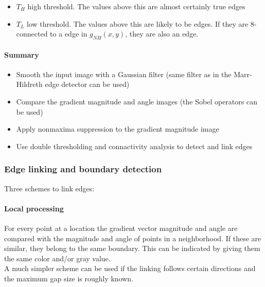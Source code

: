 \begin{itemize}
\item $T_H$ high threshold. The values above this are almost certainly true edges
\item $T_L$ low threshold. The values above this are likely to be edges. If they are 8-connected to a edge in $g_{NH}(x,y)$, they are also an edge.
\end{itemize}

\paragraph{Summary}
\begin{itemize}
\item Smooth the input image with a Gaussian filter (same filter as in the Marr-Hildreth edge detector can be used)
\item Compare the gradient magnitude and angle images (the Sobel operators can be used)
\item Apply nonmaxima suppression to the gradient magnitude image
\item Use double thresholding and connactivity analysis to detect and link edges
\end{itemize}

\subsubsection{Edge linking and boundary detection}
Three schemes to link edges:\\
\paragraph{Local processing}
For every point at a location the gradient vector magnitude and angle are compared with the magnitude and angle of points in a neighborhood. If these are similar, they belong to the same boundary. This can be indicated by giving them the same color and/or gray value.\\
A much simpler scheme can be used if the linking follows certain directions and the maximum gap size is roughly known.\\

